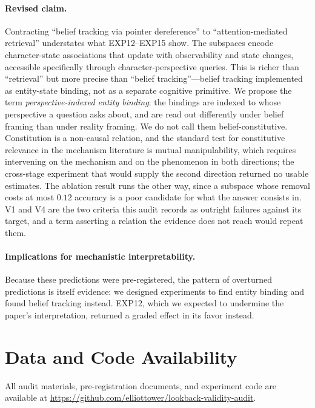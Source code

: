 \documentclass{article}
\begin{document}
\paragraph{Revised claim.}
Contracting ``belief tracking via pointer dereference'' to ``attention-mediated retrieval'' understates what EXP12--EXP15 show. The subspaces encode character-state associations that update with observability and state changes, accessible specifically through character-perspective queries. This is richer than ``retrieval'' but more precise than ``belief tracking''---belief tracking implemented as entity-state binding, not as a separate cognitive primitive. We propose the term \emph{perspective-indexed entity binding}: the bindings are indexed to
whose perspective a question asks about, and are read out differently under belief framing
than under reality framing. We do not call them belief-constitutive. Constitution is a
non-causal relation, and the standard test for constitutive relevance in the mechanism
literature is mutual manipulability, which requires intervening on the mechanism and on the
phenomenon in both directions; the cross-stage experiment that would supply the second
direction returned no usable estimates. The ablation result runs the other way, since a
subspace whose removal costs at most $0.12$ accuracy is a poor candidate for what the answer
consists in. V1 and V4 are the two criteria this audit records as outright failures against
its target, and a term asserting a relation the evidence does not reach would repeat them.

\paragraph{Implications for mechanistic interpretability.}
Because these predictions were pre-registered, the pattern of overturned predictions is itself evidence: we designed experiments to find entity binding and found belief tracking instead. EXP12, which we expected to undermine the paper's interpretation, returned a graded effect in its favor instead.


\section*{Data and Code Availability}

All audit materials, pre-registration documents, and experiment code are available at \url{https://github.com/elliottower/lookback-validity-audit}.



\end{document}

